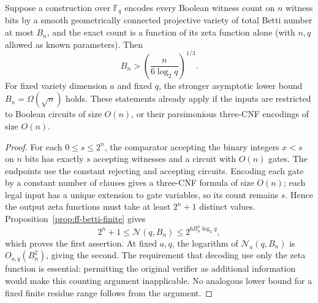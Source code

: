 \begin{corollary}\label{cor:ff-betti-information}
Suppose a construction over $\mathbb F_q$ encodes every Boolean witness count on $n$ witness bits by a smooth geometrically connected projective variety of total Betti number at most $B_n$, and the exact count is a function of its zeta function alone (with $n,q$ allowed as known parameters). Then
\[
 B_n>\left(\frac{n}{6\log_2q}\right)^{1/3}.
\]
For fixed variety dimension $a$ and fixed $q$, the stronger asymptotic lower bound $B_n=\Omega(\sqrt n)$ holds. These statements already apply if the inputs are restricted to Boolean circuits of size $O(n)$, or their parsimonious three-CNF encodings of size $O(n)$.
\end{corollary}
\begin{proof}
For each $0\leq s\leq2^n$, the comparator accepting the binary integers $x<s$ on $n$ bits has exactly $s$ accepting witnesses and a circuit with $O(n)$ gates. The endpoints use the constant rejecting and accepting circuits. Encoding each gate by a constant number of clauses gives a three-CNF formula of size $O(n)$; each legal input has a unique extension to gate variables, so its count remains $s$. Hence the output zeta functions must take at least $2^n+1$ distinct values. Proposition~\ref{prop:ff-betti-finite} gives
\[
 2^n+1\leq\mathcal N(q,B_n)\leq2^{6B_n^3\log_2q},
\]
which proves the first assertion. At fixed $a,q$, the logarithm of $\mathcal N_a(q,B_n)$ is $O_{a,q}(B_n^2)$, giving the second. The requirement that decoding use only the zeta function is essential: permitting the original verifier as additional information would make this counting argument inapplicable. No analogous lower bound for a fixed finite residue range follows from the argument.
\end{proof}

